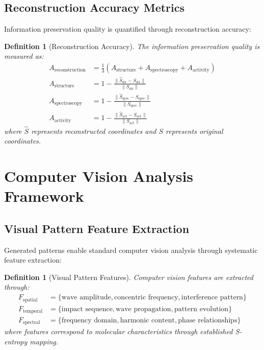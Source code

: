 \documentclass[12pt,a4paper]{article}
\newtheorem{definition}[theorem]{Definition}
\begin{document}
\subsection{Reconstruction Accuracy Metrics}

Information preservation quality is quantified through reconstruction accuracy:

\begin{definition}[Reconstruction Accuracy]
The information preservation quality is measured as:
\begin{align}
A_{\text{reconstruction}} &= \frac{1}{3}\left(A_{\text{structure}} + A_{\text{spectroscopy}} + A_{\text{activity}}\right) \\
A_{\text{structure}} &= 1 - \frac{\|\hat{S}_{\text{str}} - S_{\text{str}}\|}{\|S_{\text{str}}\|} \\
A_{\text{spectroscopy}} &= 1 - \frac{\|\hat{S}_{\text{spec}} - S_{\text{spec}}\|}{\|S_{\text{spec}}\|} \\
A_{\text{activity}} &= 1 - \frac{\|\hat{S}_{\text{act}} - S_{\text{act}}\|}{\|S_{\text{act}}\|}
\end{align}
where $\hat{S}$ represents reconstructed coordinates and $S$ represents original coordinates.
\end{definition}

\section{Computer Vision Analysis Framework}

\subsection{Visual Pattern Feature Extraction}

Generated patterns enable standard computer vision analysis through systematic feature extraction:

\begin{definition}[Visual Pattern Features]
Computer vision features are extracted through:
\begin{align}
F_{\text{spatial}} &= \{\text{wave amplitude}, \text{concentric frequency}, \text{interference pattern}\} \\
F_{\text{temporal}} &= \{\text{impact sequence}, \text{wave propagation}, \text{pattern evolution}\} \\
F_{\text{spectral}} &= \{\text{frequency domain}, \text{harmonic content}, \text{phase relationships}\}
\end{align}
where features correspond to molecular characteristics through established S-entropy mapping.
\end{definition}
\end{document}
